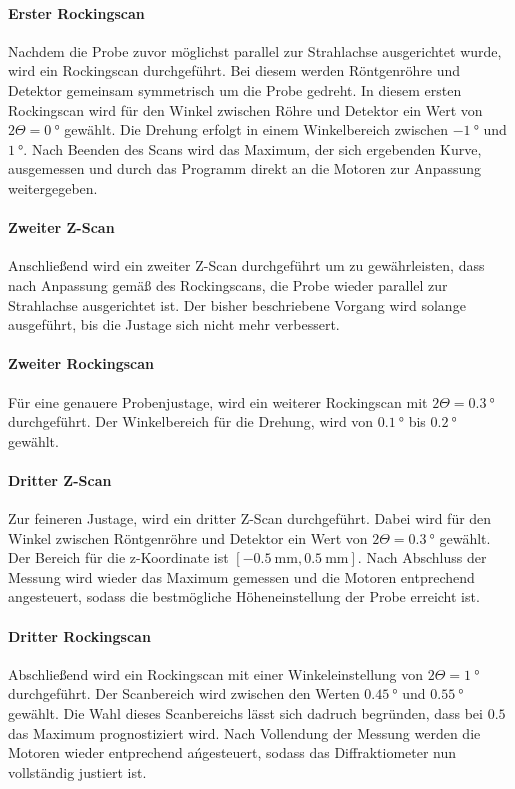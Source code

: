 \paragraph{Erster Rockingscan}
Nachdem die Probe zuvor möglichst parallel zur Strahlachse ausgerichtet wurde,
wird ein Rockingscan durchgeführt. Bei diesem werden Röntgenröhre und
Detektor gemeinsam symmetrisch um die Probe gedreht. In diesem ersten
Rockingscan wird für den Winkel zwischen Röhre und Detektor ein Wert von
$2\Theta = \SI{0}{\degree}$ gewählt. Die Drehung erfolgt in einem Winkelbereich
zwischen $\SI{-1}{\degree}$ und $\SI{1}{\degree}$. Nach Beenden des Scans wird
das Maximum, der sich ergebenden Kurve, ausgemessen und durch das Programm direkt
an die Motoren zur Anpassung weitergegeben.


\paragraph{Zweiter Z-Scan}
Anschließend wird ein zweiter Z-Scan durchgeführt um zu gewährleisten, dass
nach Anpassung gemäß des Rockingscans, die Probe wieder parallel zur Strahlachse
ausgerichtet ist. Der bisher
beschriebene Vorgang wird solange ausgeführt, bis die Justage sich nicht mehr
verbessert.



\paragraph{Zweiter Rockingscan}
Für eine genauere Probenjustage, wird ein weiterer Rockingscan mit
$2\Theta = \SI{0.3}{\degree}$ durchgeführt. Der Winkelbereich für die Drehung,
wird von $\SI{0.1}{\degree}$ bis $\SI{0.2}{\degree}$ gewählt.


\paragraph{Dritter Z-Scan}
Zur feineren Justage, wird ein dritter Z-Scan durchgeführt.
Dabei wird für den Winkel zwischen Röntgenröhre und Detektor ein Wert von
$2\Theta = \SI{0.3}{\degree}$ gewählt. Der Bereich für die z-Koordinate
ist $[\SI{-0.5}{\milli\meter}, \SI{0.5}{\milli\meter}]$.
Nach Abschluss der Messung wird wieder das Maximum gemessen und
die Motoren entprechend angesteuert, sodass die bestmögliche Höheneinstellung
der Probe erreicht ist.


\paragraph{Dritter Rockingscan}
Abschließend wird ein Rockingscan mit einer Winkeleinstellung von
$2\Theta = \SI{1}{\degree}$ durchgeführt. Der Scanbereich wird zwischen den Werten
$\SI{0.45}{\degree}$ und $\SI{0.55}{\degree}$ gewählt. Die Wahl dieses Scanbereichs lässt sich dadruch begründen,
dass bei $0.5$ das Maximum prognostiziert wird. Nach Vollendung der Messung
werden die Motoren wieder entprechend ańgesteuert, sodass das Diffraktiometer
nun vollständig justiert ist.



